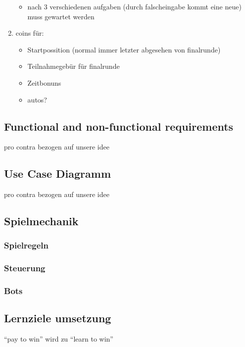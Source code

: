 \begin{enumerate}
\begin{itemize}
				\item{nach 3 verschiedenen aufgaben (durch falscheingabe kommt eine neue) muss gewartet werden}
			\end{itemize}
		\item{coins für:}
		\begin{itemize}
			\item{Startpossition (normal immer letzter abgesehen von finalrunde)}
			\item{Teilnahmegebür für finalrunde}
			\item{Zeitbonuns}
			\item{autos?}
		\end{itemize}
	\end{enumerate}

\subsection{Functional and non-functional requirements}
	pro contra bezogen auf unsere idee
\subsection{Use Case Diagramm}
	pro contra bezogen auf unsere idee
\subsection{Spielmechanik}
	\subsubsection{Spielregeln}
	\subsubsection{Steuerung}
	\subsubsection{Bots}
\subsection{Lernziele umsetzung}
	\enquote{pay to win} wird zu \enquote{learn to win}
